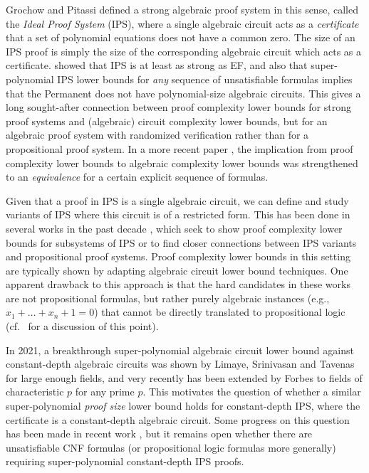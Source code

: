 \documentclass[11pt,letter]{article}
\theoremstyle{remark} %
\begin{document}
    Grochow and Pitassi \cite{GP18} defined a strong algebraic proof system in this sense, called the {\it Ideal Proof System} (IPS), where a single algebraic circuit acts as a {\it certificate} that a set of polynomial equations does not have a common zero. The size of an IPS proof is simply the size of the corresponding algebraic circuit which acts as a certificate. \cite{GP18} showed that IPS is at least as strong as EF, and also that super-polynomial IPS lower bounds for {\it any} sequence of unsatisfiable formulas implies that the Permanent does not have polynomial-size algebraic circuits. This gives a long sought-after connection between proof complexity lower bounds for strong proof systems and (algebraic) circuit complexity lower bounds, but for an algebraic proof system with randomized verification rather than for a propositional proof system. In a more recent paper \cite{ST25}, the implication from proof complexity lower bounds to algebraic complexity lower bounds was strengthened to an {\it equivalence} for a certain explicit sequence of formulas. 

    Given that a proof in IPS is a single algebraic circuit, we can define and study variants of IPS where this circuit is of a restricted form. This has been done in several works in the past decade \cite{FSTW21,AF22,GHT22,HLT24}, which seek to show proof complexity lower bounds for subsystems of IPS or to find closer connections between IPS variants and propositional proof systems. Proof complexity lower bounds in this setting are typically shown by adapting algebraic circuit lower bound techniques. One apparent drawback to this approach is that the hard candidates in these works are not propositional formulas, but rather purely algebraic instances (e.g., $x_1+\dots+x_n + 1 =0$) that cannot be directly translated to propositional logic (cf.~\cite{EGLT25} for a discussion of this point).
    
    In 2021, a breakthrough super-polynomial algebraic circuit lower bound against constant-depth algebraic circuits was shown by Limaye, Srinivasan and Tavenas \cite{LST25} for large enough fields, and very recently has been extended by Forbes \cite{forbes2024low} to fields of characteristic $p$ for any prime $p$. This motivates the question of whether a similar super-polynomial {\it proof size} lower bound holds for constant-depth IPS, where the certificate is a constant-depth algebraic circuit. Some progress on this question has been made in recent work \cite{AF22,GHT22,HLT24}, but it remains open whether there are unsatisfiable CNF formulas (or propositional logic formulas more generally) requiring super-polynomial constant-depth IPS proofs.
\end{document}
